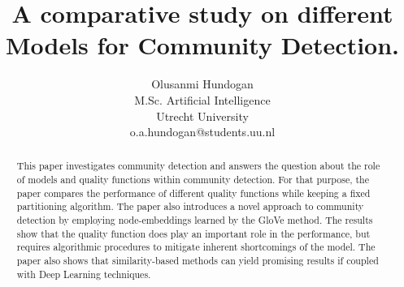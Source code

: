 \documentclass[11pt, twocolumn]{article}
\begin{document}
\title{A comparative study on different Models for Community Detection.}
\author{Olusanmi Hundogan\\M.Sc. Artificial Intelligence\\Utrecht University\\o.a.hundogan@students.uu.nl}

\maketitle
\begin{abstract} 
This paper investigates community detection and answers the question about the role of models and quality functions within community detection. For that purpose, the paper compares the performance of different quality functions while keeping a fixed partitioning algorithm. The paper also introduces a novel approach to community detection by employing node-embeddings learned by the GloVe method. The results show that the quality function does play an important role in the performance, but requires algorithmic procedures to mitigate inherent shortcomings of the model. The paper also shows that similarity-based methods can yield promising results if coupled with Deep Learning techniques. 
\end{abstract}

\end{document}
